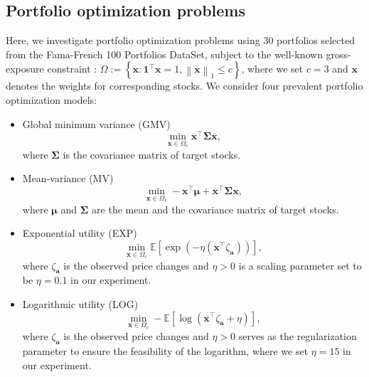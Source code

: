 \documentclass[aos]{imsart}
\numberwithin{equation}{section}
\theoremstyle{plain}
\begin{document}
\subsection{Portfolio optimization problems}
Here, we investigate portfolio optimization problems using $30$ portfolios selected from the Fama-French 100 Portfolios DataSet, subject to the well-known gross-exposure constraint \cite{Fan2012Vast}:
$\Omega := \left\{\bm{x}: \bm{1}^{\top} \bm{x} = 1, \left\| \bm{x} \right\|_1 \leq c\right\}$,
where we set $c =3$ and $\bm{x}$ denotes the weights for corresponding stocks. We consider four prevalent portfolio optimization models:
\begin{itemize}
        \item Global minimum variance (GMV)
        \begin{equation*}
            \min_{\bm{x} \in \Omega_c} \bm{x}^{\top} \bm{\Sigma} \bm{x},
        \end{equation*}
        where $\bm{\Sigma}$ is the covariance matrix of target stocks.

        \item Mean-variance (MV)
        \begin{equation*}
            \min_{\bm{x} \in \Omega_c}  -\bm{x}^{\top}\bm{\mu} + \bm{x}^{\top} \bm{\Sigma} \bm{x},
        \end{equation*}
        where $\bm{\mu}$ and $\bm{\Sigma}$ are the mean and the covariance matrix of target stocks.

        \item Exponential utility (EXP)
        \begin{equation*}
            \min_{\bm{x} \in \Omega_c} \mathbb{E} \left[ \exp \left(-\eta \left(\bm{x}^{\top} \zeta_{\bm{a}} \right)\right) \right],
        \end{equation*}
        where $\zeta_{\bm{a}}$ is the observed price changes and $\eta>0$ is a scaling parameter set to be $\eta= 0.1$ in our experiment.

        \item Logarithmic utility (LOG) 
        \begin{equation*}
            \min_{\bm{x} \in \Omega_c}  -\mathbb{E} \left[ \log \left( \bm{x}^{\top} \zeta_{\bm{a}}+ \eta \right)  \right],
        \end{equation*}
        where $\zeta_{\bm{a}}$ is the observed price changes and $\eta>0$ serves as the regularization parameter to ensure the feasibility of the logarithm, where we set $\eta=15$ in our experiment.
    \end{itemize}
\end{document}

